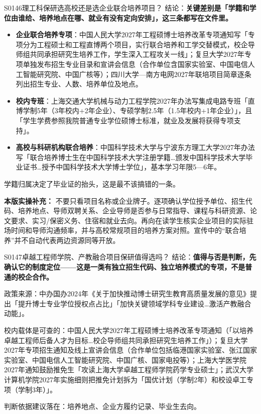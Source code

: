 \begin{qa}{S0146}{理工科保研选高校还是选企业联合培养项目？}
结论：\textbf{关键差别是「学籍和学位由谁给、培养地点在哪、就业有没有定向安排」，这三条都写在文件里。}

\begin{itemize}
  \item \textbf{企业联合培养专项}：中国人民大学2027年工程硕博士培养改革专项通知写「专项分为工程硕士和工程直博两个项目，实行联合培养和工学交替模式，校企导师组共同承担研究生培养工作，学生深入工程攻关一线」；复旦大学2027年专项单独发布招生专业目录和宣讲会信息（合作单位含国家实验室、中国电信人工智能研究院、中国广核等）；四川大学—南方电网2027年联培项目简章逐条列出招生专业、人数、培养单位及地点。
  \item \textbf{校内专班}：上海交通大学机械与动力工程学院2027年办法写集成电路专班「直博学制5年（3年校内+2年企业）、专硕学制2.5年（1.5年校内+1年企业）」，且「学生学费参照我院普通专业学位硕博士标准，就业及发展将获得专项支持」。
  \item \textbf{高校与科研机构联合培养}：中国科学技术大学与宁波东方理工大学2027年办法写「联合培养博士生在中国科学技术大学注册学籍…颁发中国科学技术大学毕业证书…授予中国科学技术大学博士学位」，基本学习年限5—6年。
\end{itemize}

学籍归属决定了毕业证的抬头，这是最不该搞错的一条。
\par\textbf{本版实操补充：} 不要只看项目名称或企业牌子。逐项确认学位授予单位、招生代码、培养地点、导师双聘关系、企业导师是否参与日常指导、课程与科研资源、论文要求、实习/保密义务、住宿和就业去向。再向在读学生核实企业项目的实际驻场时间和导师沟通频率，并与高校常规项目的培养方案对照。宣传中的“联合培养”并不自动代表两边资源同等开放。
\end{qa}

\begin{qa}{S0147}{卓越工程师学院、产教融合项目保研值得选吗？}
结论：\textbf{值得与否是判断，先确认它的制度定位——这是一类有独立招生代码、独立培养模式的专项，不是普通的校企合作。}

政策来源：中办国办2024年《关于加快推动博士研究生教育高质量发展的意见》提出「提升博士专业学位授权点占比」「加快关键领域学科专业建设…激活产教融合动能」。

校内载体是可查的：中国人民大学2027年工程硕博士培养改革专项通知（「以培养卓越工程师后备人才为目标…校企导师组共同承担研究生培养工作」）；复旦大学2027年专项招生通知及线上宣讲会信息（合作单位包括临港国家实验室、张江国家实验室、中国电信人工智能研究院、中国广核、国家电投等）；上海大学医学院2027年通知鼓励推免生「攻读上海大学卓越工程师学院药学专业硕士」；武汉大学计算机学院2027年实施细则把推免计划拆为「国优计划（学制2年）和校设卓工专项（学制3年）」。

判断依据建议落在：培养地点、企业方履约记录、毕业生去向。
\end{qa}


